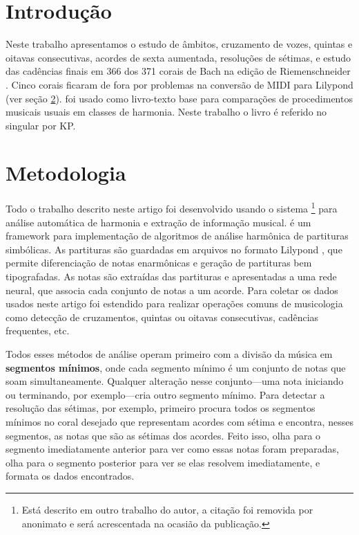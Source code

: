 \section{Introdução}
\label{sec:introducao}

\cite{kugel92:beyond}

\cite{honing04:comeback}
\cite{coutinho05:conputational}
\cite{hartmann07:interactive}

Neste trabalho apresentamos o estudo de âmbitos, cruzamento de vozes,
quintas e oitavas consecutivas, acordes de sexta aumentada, resoluções
de sétimas, e estudo das cadências finais em 366 dos 371 corais de
Bach na edição de Riemenschneider \cite{bach41:371}. Cinco corais
ficaram de fora por problemas na conversão de MIDI para Lilypond (ver
seção \ref{sec:metodologia}). \cite{kostka.ea00:tonal} foi usado como
livro-texto base para comparações de procedimentos musicais usuais em
classes de harmonia. Neste trabalho o livro é referido no singular por
KP.

\section{Metodologia}
\label{sec:metodologia}

Todo o trabalho descrito neste artigo foi desenvolvido usando o
sistema \rameau{}\footnote{Está descrito em outro trabalho do autor, a
  citação foi removida por anonimato e será acrescentada na ocasião da
  publicação.} para análise automática de harmonia e extração de
informação musical. \rameau{} é um framework para implementação de
algoritmos de análise harmônica de partituras simbólicas. As
partituras são guardadas em arquivos no formato Lilypond
\cite{nienhuys.ea08:lilypond}, que permite diferenciação de notas
enarmônicas e geração de partituras bem tipografadas. As notas são
extraídas das partituras e apresentadas a uma rede neural, que associa
cada conjunto de notas a um acorde. Para coletar os dados usados neste
artigo \rameau{} foi estendido para realizar operações comuns de
musicologia como detecção de cruzamentos, quintas ou oitavas
consecutivas, cadências frequentes, etc.

Todos esses métodos de análise operam primeiro com a divisão da música
em \textbf{segmentos mínimos}, onde cada segmento mínimo é um conjunto
de notas que soam simultaneamente. Qualquer alteração nesse
conjunto---uma nota iniciando ou terminando, por exemplo---cria outro
segmento mínimo. Para detectar a resolução das sétimas, por exemplo,
\rameau{} primeiro procura todos os segmentos mínimos no coral
desejado que representam acordes com sétima e encontra, nesses
segmentos, as notas que são as sétimas dos acordes. Feito isso,
\rameau{} olha para o segmento imediatamente anterior para ver como
essas notas foram preparadas, olha para o segmento posterior para ver
se elas resolvem imediatamente, e formata os dados encontrados.


